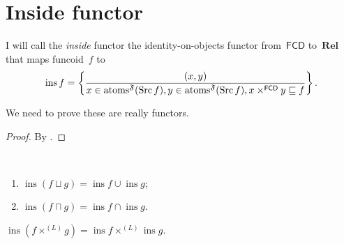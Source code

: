 \chapter{Inside functor}

\begin{defn}
I will call the \emph{inside} functor the identity-on-objects functor from~$\mathsf{FCD}$ to~$\mathbf{Rel}$ that maps
funcoid~$f$ to
\[
\operatorname{ins} f =
\left\{ \frac{(x,y)}{x\in\operatorname{atoms}^{\mathfrak{F}}(\operatorname{Src} f), y\in\operatorname{atoms}^{\mathfrak{F}}(\operatorname{Src} f), x\times^{\mathsf{FCD}}y\sqsubseteq f}\right\}. \]
\end{defn}

We need to prove these are really functors.

\begin{proof}
By \cite[proposition~]{volume-1}.
\end{proof}

\begin{prop}
~
\begin{enumerate}
\item $\operatorname{ins}(f\sqcup g)=\operatorname{ins}f\cup\operatorname{ins}g$;
\item $\operatorname{ins}(f\sqcap g)=\operatorname{ins}f\cap\operatorname{ins}g$.
\end{enumerate}
\end{prop}

\begin{prop}
$\operatorname{ins}(f\times^{(L)} g) =
\operatorname{ins}f\times^{(L)}\operatorname{ins}g$.
\end{prop}